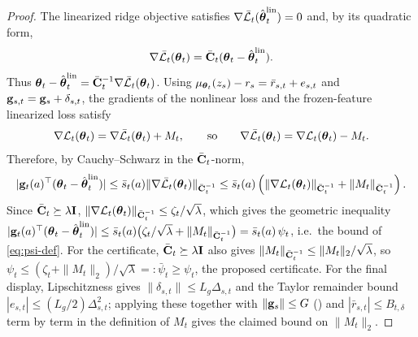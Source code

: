 \documentclass[twoside]{article}
\begin{document}
\begin{proof}
The linearized ridge objective satisfies
$\nabla \bar{\mathcal{L}}_t(\hat{\boldsymbol{\theta}}_t^{\mathrm{lin}})=0$ and, by its
quadratic form,
\[
  \nabla \bar{\mathcal{L}}_t(\boldsymbol{\theta}_t)
  =
  \bar{\mathbf{C}}_t(\boldsymbol{\theta}_t-\hat{\boldsymbol{\theta}}_t^{\mathrm{lin}}).
\]
Thus
$\boldsymbol{\theta}_t-\hat{\boldsymbol{\theta}}_t^{\mathrm{lin}}
=\bar{\mathbf{C}}_t^{-1}\nabla\bar{\mathcal{L}}_t(\boldsymbol{\theta}_t)$.
Using
$\mu_{\boldsymbol{\theta}_t}(z_s)-r_s=\bar r_{s,t}+e_{s,t}$ and
$\mathbf{g}_{s,t}=\mathbf{g}_s+\delta_{s,t}$, the gradients of the nonlinear loss
and the frozen-feature linearized loss satisfy
\[
  \nabla \mathcal{L}_t(\boldsymbol{\theta}_t)
  =
  \nabla \bar{\mathcal{L}}_t(\boldsymbol{\theta}_t)+M_t,
  \qquad
  \text{so}\qquad
  \nabla \bar{\mathcal{L}}_t(\boldsymbol{\theta}_t)=\nabla \mathcal{L}_t(\boldsymbol{\theta}_t)-M_t .
\]
Therefore, by Cauchy--Schwarz in the $\bar{\mathbf{C}}_t$-norm,
\[
  |\mathbf{g}_t(a)^\top(\boldsymbol{\theta}_t-\hat{\boldsymbol{\theta}}_t^{\mathrm{lin}})|
  \le
  \bar s_t(a)
  \|\nabla \bar{\mathcal{L}}_t(\boldsymbol{\theta}_t)\|_{\bar{\mathbf{C}}_t^{-1}}
  \le
  \bar s_t(a)
  \left(
    \|\nabla \mathcal{L}_t(\boldsymbol{\theta}_t)\|_{\bar{\mathbf{C}}_t^{-1}}
    +
    \|M_t\|_{\bar{\mathbf{C}}_t^{-1}}
  \right).
\]
Since $\bar{\mathbf{C}}_t\succeq\lambda\mathbf{I}$,
$\|\nabla \mathcal{L}_t(\boldsymbol{\theta}_t)\|_{\bar{\mathbf{C}}_t^{-1}}\le \zeta_t/\sqrt{\lambda}$,
which gives the geometric inequality
$|\mathbf{g}_t(a)^\top(\boldsymbol{\theta}_t-\hat{\boldsymbol{\theta}}_t^{\mathrm{lin}})|
\le\bar s_t(a)\bigl(\zeta_t/\sqrt{\lambda}+\|M_t\|_{\bar{\mathbf{C}}_t^{-1}}\bigr)
=\bar s_t(a)\,\psi_t$, i.e.\ the bound of \eqref{eq:psi-def}.
For the certificate, $\bar{\mathbf{C}}_t\succeq\lambda\mathbf{I}$ also gives
$\|M_t\|_{\bar{\mathbf{C}}_t^{-1}}\le\|M_t\|_2/\sqrt{\lambda}$, so
$\psi_t\le(\zeta_t+\|M_t\|_2)/\sqrt{\lambda}=:\bar\psi_t\ge\psi_t$, the proposed
certificate.
For the final display, Lipschitzness gives
$\|\delta_{s,t}\|\le L_g\Delta_{s,t}$ and the Taylor remainder bound
$|e_{s,t}|\le (L_g/2)\Delta_{s,t}^2$; applying these together with
$\|\mathbf{g}_s\|\le G$ () and $|\bar r_{s,t}|\le B_{t,\delta}$
term by term in the definition of $M_t$ gives the claimed bound on $\|M_t\|_2$.
\end{proof}
\end{document}
